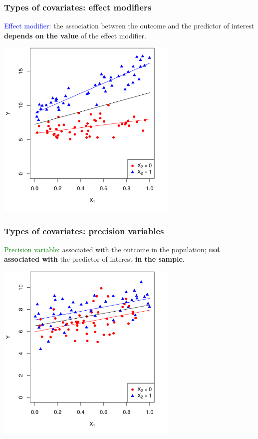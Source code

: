 \documentclass[12pt, 
hyperref={colorlinks=true, linkcolor=blue, urlcolor=cyan},dvipsnames]{beamer}
\begin{document}
\begin{frame}
\frametitle{Types of covariates: effect modifiers}

\textcolor{blue}{Effect modifier}: the association between the outcome and the predictor of interest \textbf{depends on the value} of the effect modifier.

\centering
\vspace{-0.2cm}
\includegraphics[width=0.65\textwidth]{plots/effect_modification_colored_with_lines.png}
\end{frame}

\begin{frame}
\frametitle{Types of covariates: precision variables}

\textcolor{green}{Precision variable}: associated with the outcome in the population; \textbf{not associated with} the predictor of interest \textbf{in the sample}.

\centering
\vspace{-0.2cm}
 \includegraphics[width=0.65\textwidth]{plots/precision_colored_with_multiple_lines.png}
\end{frame}
\end{document}
